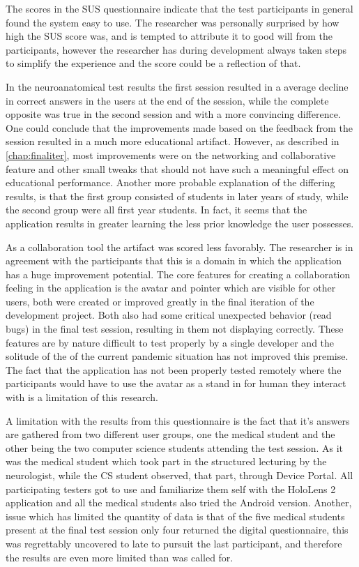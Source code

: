 The scores in the SUS questionnaire indicate that the test participants in general found the system easy to use. The researcher was personally surprised by how high the SUS score was, and is tempted to attribute it to good will from the participants, however the researcher has during development always taken steps to simplify the experience and the score could be a reflection of that.

In the neuroanatomical test results the first session resulted in a average decline in correct answers in the users at the end of the session, while the complete opposite was true in the second session and with a more convincing difference. One could conclude that the improvements made based on the feedback from the session resulted in a much more educational artifact. However, as described in \autoref{chap:finaliter}, most improvements were on the networking and collaborative feature and other small tweaks that should not have such a meaningful effect on educational performance. Another more probable explanation of the differing results, is that the first group consisted of students in later years of study, while the second group were all first year students. In fact, it seems that the application results in greater learning the less prior knowledge the user possesses.

As a collaboration tool the artifact was scored less favorably. The researcher is in agreement with the participants that this is a domain in which the application has a huge improvement potential. The core features for creating a collaboration feeling in the application is the avatar and pointer which are visible for other users, both were created or improved greatly in the final iteration of the development project. Both also had some critical unexpected behavior (read bugs) in the final test session, resulting in them not displaying correctly. These features are by nature difficult to test properly by a single developer and the solitude of the of the current pandemic situation has not improved this premise. The fact that the application has not been properly tested remotely where the participants would have to use the avatar as a stand in for human they interact with is a limitation of this research.


A limitation with the results from this questionnaire is the fact that it's answers are gathered from two different user groups, one the medical student and the other being the two computer science students attending the test session. As it was the medical student which took part in the structured lecturing by the neurologist, while the CS student observed, that part, through Device Portal. All participating testers got to use and familiarize them self with the HoloLens 2 application and all the medical students also tried the Android version.
Another, issue which has limited the quantity of data is that of the five medical students present at the final test session only four returned the digital questionnaire, this was regrettably uncovered to late to pursuit the last participant, and therefore the results are even more limited than was called for.


